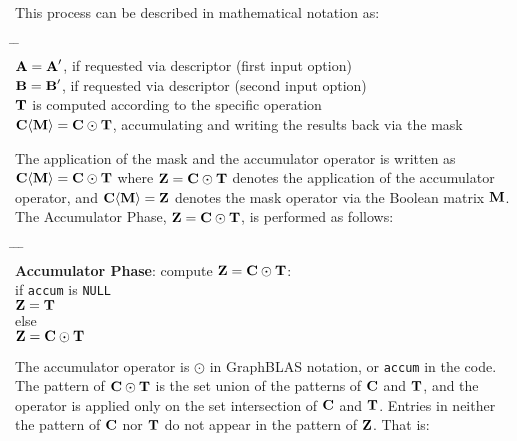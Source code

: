 \documentclass[12pt]{article}
\begin{document}
\noindent
This process can be described in mathematical notation as:
    \vspace{-0.2in}
    {\small
    \begin{tabbing}
    \hspace{2em} \= \hspace{2em} \= \hspace{2em} \= \\
    \> ${\bf A = A}'$, if requested via descriptor (first input option) \\
    \> ${\bf B = B}'$, if requested via descriptor (second input option) \\
    \> ${\bf T}$ is computed according to the specific operation  \\
    \> ${\bf C \langle M \rangle = C \odot T}$,
        accumulating and writing the results back via the mask
    \end{tabbing} }
\noindent
The application of the mask and the accumulator operator is written as
${\bf C \langle M \rangle = C \odot T}$ where ${\bf Z = C \odot T}$ denotes the
application of the accumulator operator, and
${\bf C \langle M \rangle = Z}$
denotes the mask operator via the Boolean matrix ${\bf M}$.  The Accumulator
Phase, ${\bf Z = C \odot T}$, is performed as follows:
    \vspace{-0.2in}
    {\small
    \begin{tabbing}
    \hspace{2em} \= \hspace{2em} \= \hspace{2em} \= \hspace{2em} \= \\
    \> {\bf Accumulator Phase}: compute ${\bf Z = C \odot T}$: \\
    \> \> if \verb'accum' is \verb'NULL' \\
    \> \>\>    ${\bf Z = T}$ \\
    \> \> else \\
    \> \>\>    ${\bf Z = C \odot T}$
    \end{tabbing}}
The accumulator operator is $\odot$ in GraphBLAS notation, or \verb'accum'
in the code.  The pattern of ${\bf C \odot T}$ is the set union of the
patterns of ${\bf C}$ and ${\bf T}$, and the operator is applied only on the
set intersection of ${\bf C}$ and ${\bf T}$.  Entries in neither the pattern
of ${\bf C}$ nor ${\bf T}$ do not appear in the pattern of ${\bf Z}$.  That is:
    \newpage %
\end{document}
